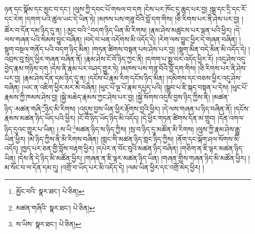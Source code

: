 ཉན་དང་སྣོམ་དང་མྱང་བ་དང་། །ལུས་ཀྱི་དབང་པོ་གསལ་བ་དག །ངེས་པར་ཁོང་དུ་ཆུད་པར་བྱ། །སྒྲ་དང་དྲི་དང་རོ་དང་རེག །དགག་པའི་ཚུལ་ཡང་དེ་ཡིན་ཏེ། །མཁས་པས་གཟུ་བོའི་བློ་དག་གིས། །ཅི་རིགས་པར་ནི་ཤེས་པར་བྱ། །ཚོར་བ་དོན་དམ་ཉིད་དུ་ན། །:མྱང་བའི་\footnote{མྱོང་བའི་  སྣར་ཐང་།  པེ་ཅིན། }བདག་ཉིད་ཡིན་མི་རིགས། །རྣམ་ཤེས་མཚུངས་པར་ལྡན་པའི་ཕྱིར། །དེ་ལས་གཞན་པའི་སེམས་བྱུང་བཞིན། །བདེ་བ་ཕན་འདོགས་མི་འདོད་དེ། །རེག་ལས་བྱུང་ཕྱིར་དེ་གཞན་བཞིན། །སྡུག་བསྔལ་གནོད་པའི་བདག་ཉིད་མིན། །གཏན་ཚིགས་བསྟན་པས་ཤེས་པར་བྱ། །སྡུག་མིན་བདེ་མིན་མི་འདོད་དེ། །འབྲས་བུ་སྲེད་ཕྱིར་གཞན་བཞིན་ནོ། །རྣམ་ཤེས་ངོ་བོ་ཉིད་ཀྱང་ནི། །དགག་པ་སྨྲ་བར་འདོད་ཕྱིར་རོ། །འདུ་ཤེས་འདུ་བྱེད་རྣམ་གཉིས་དག །དེས་ནི་རྣམ་པར་བཤད་གྱུར་ཏེ། །མཁས་པས་གཟུ་བོའི་བློ་དག་གིས། །ཅི་རིགས་པར་ནི་ཤེས་པར་བྱ། །རྣམ་ཤེས་དོན་དམ་ཉིད་དུ་ན། །དངོས་པོ་རྣམ་རིག་དངོས་ཉིད་མིན། །དམིགས་དང་བཅས་ཕྱིར་འདུ་ཤེས་བཞིན། །ཡང་ན་འཇིག་ཕྱིར་མར་མེ་བཞིན། །ཕུང་པོ་ལྔ་པོ་རྣམ་དཔྱད་པའི། །སྒྲུབ་པ་ཇི་སྐད་བསྟན་པ་དེས། །ཕུང་པོ་རྣམས་ཀྱི་ཁམས་ཤེས་བྱ། །སྐྱེ་མཆེད་རྣམས་ཀྱང་ཤེས་པར་བྱ། །སྐྱེ་སོགས་འདུས་བྱས་ཉིད་ཀྱིས་ནི། །མཚན་ཉིད་:མཚན་གཞི་\footnote{མཚན་གཞིའི་  སྣར་ཐང་།  པེ་ཅིན། }ཉིད་མི་རིགས། །འདུས་བྱས་ཡིན་ཕྱིར་རྟོགས་བྱའི་ཕྱིར། །དེ་ལས་གཞན་པ་ཉིད་བཞིན་ནོ། །དངོས་རྣམས་མཚན་ཉིད་ཡོད་པའི་ཕྱིར། །ངོ་བོ་ཉིད་ཡོད་ཉིད་མི་འདོད། །དེ་ཕྱིར་གཏན་ཚིགས་དོན་མ་གྲུབ། །དོན་འགལ་ཉིད་དུའང་གྱུར་པ་ཡིན། །:ས་ཡི་\footnote{ས་ཡིས་  སྣར་ཐང་།  པེ་ཅིན། }མཚན་ཉིད་ས་ཉིད་ཀྱིས། །སྲ་བ་ཉིད་དུ་མཚོན་མི་རིགས། །ལུས་ཀྱི་རྣམ་ཤེས་རྒྱུ་ཡིན་ཕྱིར། །མེ་ཉིད་ཀྱིས་ནི་མི་རིགས་བཞིན། །གླང་གི་མཚན་ཉིད་གླང་ཉིད་ཀྱིས། །ནོག་དང་ལྐོག་ཤལ་སོགས་མི་འདོད། །ཁྱད་པར་ཅན་གྱི་བློས་བརྟག་ཕྱིར། །དཔེར་ན་བོང་བུའི་མཚན་ཉིད་བཞིན། །གཅིག་ན་ཇི་ལྟར་མཚན་ཉིད་ཡིན། །དེས་ནི་དེ་ཉིད་མི་མཚོན་ཕྱིར། །གཞན་ན་ཇི་ལྟར་མཚན་ཉིད་ཡིན། །གཞན་གྱིས་གཞན་ཉིད་མི་མཚོན་ཕྱིར། །མ་སོང་བ་ལ་དོན་དམ་དུ། །འགྲོ་བ་ཡོད་པར་མི་འདོད་དེ། །ལམ་ཡིན་ཕྱིར་དང་འགྲོ་མེད་ཕྱིར། །
